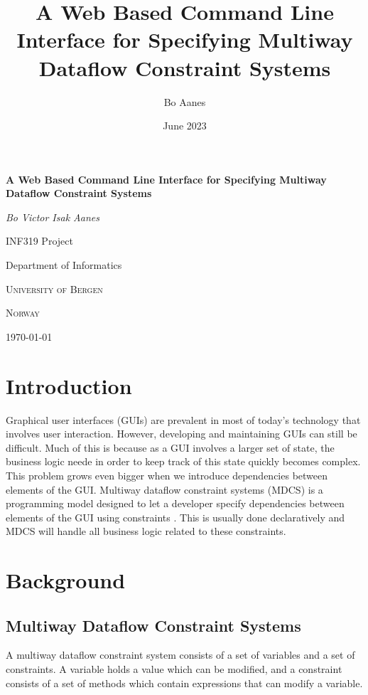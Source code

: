 \documentclass[11pt, a4paper]{article}
\title{A Web Based Command Line Interface for Specifying Multiway Dataflow Constraint Systems}
\author{Bo Aanes}
\date{June 2023}
\begin{document}
\begin{titlepage}
    \centering
    \vspace*{\fill}
    {\huge\bfseries A Web Based Command Line Interface for Specifying Multiway Dataflow Constraint Systems\par}
    \vspace{2cm}
    {\Large\itshape Bo Victor Isak Aanes\par}
    \vfill
    {\LARGE INF319 Project\par}
    {\cshape\large Department of Informatics\par}
    {\scshape\large University of Bergen\par}
    {\scshape\large Norway\par}
    \vspace{1cm}
    {\large \today\par}
    \vfill
\end{titlepage}
\tableofcontents
\clearpage

\section{Introduction}
\label{sec:introduction}
Graphical user interfaces (GUIs) are prevalent in most of today's technology that involves user interaction. However, developing and maintaining GUIs can still be difficult. Much of this is because as a GUI involves a larger set of state, the business logic neede in order to keep track of this state quickly becomes complex. This problem grows even bigger when we introduce dependencies between elements of the GUI. Multiway dataflow constraint systems (MDCS) is a programming model designed to let a developer specify dependencies between elements of the GUI using constraints \cite{semantics}. This is usually done declaratively and MDCS will handle all business logic related to these constraints. 

\section{Background}
\label{sec:background}
\subsection{Multiway Dataflow Constraint Systems}
\label{sec:mdcs}
A multiway dataflow constraint system consists of a set of variables and a set of constraints. A variable holds a value which can be modified, and a constraint consists of a set of methods which contain expressions that can modify a variable.
\end{document}
